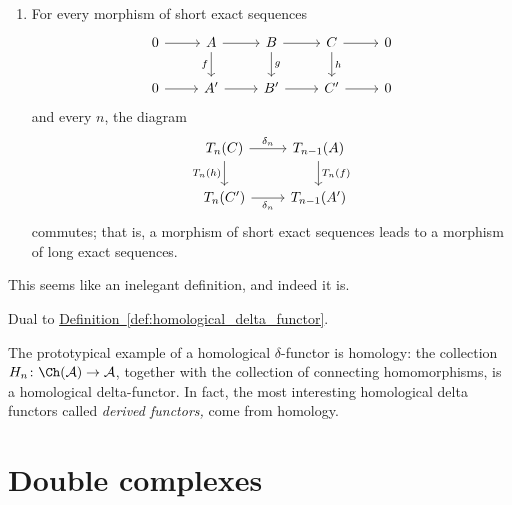 \documentclass[main.tex]{subfiles}
\begin{document}
\begin{definition}
\begin{enumerate}
    \item For every morphism of short exact sequences
      \begin{equation*}
        \begin{tikzcd}
          0
          \arrow[r]
          & A
          \arrow[r]
          \arrow[d, swap, "f"]
          & B
          \arrow[r]
          \arrow[d, "g"]
          & C
          \arrow[r]
          \arrow[d, "h"]
          & 0
          \\
          0
          \arrow[r]
          & A'
          \arrow[r]
          & B'
          \arrow[r]
          & C'
          \arrow[r]
          & 0
        \end{tikzcd}
      \end{equation*}
      and every $n$, the diagram
      \begin{equation*}
        \begin{tikzcd}
          T_{n}(C)
          \arrow[r, "\delta_{n}"]
          \arrow[d, swap, "T_{n}(h)"]
          & T_{n-1}(A)
          \arrow[d, "T_{n}(f)"]
          \\
          T_{n}(C')
          \arrow[r, swap, "\delta_{n}"]
          & T_{n-1}(A')
        \end{tikzcd}
      \end{equation*}
      commutes; that is, a morphism of short exact sequences leads to a morphism of long exact sequences.
  \end{enumerate}
\end{definition}

This seems like an inelegant definition, and indeed it is.

\begin{definition}
  \label{def:cohomological_delta_functors}
  Dual to \hyperref[def:homological_delta_functor]{Definition~\ref*{def:homological_delta_functor}}.
\end{definition}

\begin{example}
  The prototypical example of a homological $\delta$-functor is homology: the collection $H_{n}\colon \Ch(\mathcal{A}) \to \mathcal{A}$, together with the collection of connecting homomorphisms, is a homological delta-functor. In fact, the most interesting homological delta functors called \emph{derived functors,} come from homology.
\end{example}


\section{Double complexes}
\label{sec:double_complexes}
\end{document}
